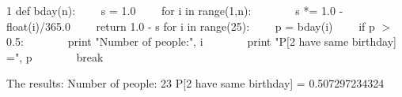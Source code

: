 \documentclass{report}
\begin{document}
1 def bday(n):                        $\hspace{20pt}$    s = 1.0                         $\hspace{20pt}$    for i in range(1,n):            $\hspace{40pt}$       s *= 1.0 - float(i)/365.0   $\hspace{20pt}$    return 1.0 - s                    for i in range(25):                             $\hspace{20pt}$    p = bday(i)                                 $\hspace{20pt}$    if p $>$ 0.5:                                 $\hspace{40pt}$        print "Number of people:", i            $\hspace{40pt}$        print "P[2 have same birthday] =", p    $\hspace{40pt}$        break                                   \newline

The results: \newline
Number of people: 23 \newline
P[2 have same birthday] = 0.507297234324
\end{document}
